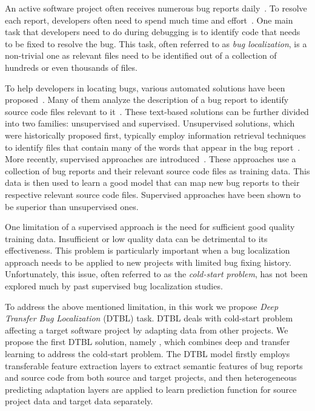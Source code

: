 An active software project often receives numerous bug reports daily~\cite{AnvikHM05}. To resolve each report, developers often need to spend much time and effort~\cite{Tassey02}. One main task that developers need to do during debugging is to identify code that needs to be fixed to resolve the bug. This task, often referred to as {\em bug localization}, is a non-trivial one as relevant files need to be identified out of a collection of hundreds or even thousands of files.

To help developers in locating bugs, various automated solutions have been proposed~\cite{JonesH05,lukins2008source,rao2011retrieval,SahaLKP14,huo2016learning}. Many of them analyze the description of a bug report to identify source code files relevant to it~\cite{lukins2008source,rao2011retrieval,SahaLKP14,huo2016learning}. These text-based solutions can be further divided into two families: unsupervised and supervised. Unsupervised solutions, which were historically proposed first, typically employ information retrieval techniques to identify files that contain many of the words that appear in the bug report~\cite{lukins2008source,rao2011retrieval,SahaLKP14}. More recently, supervised approaches are introduced~\cite{huo2016learning}. These approaches use a collection of bug reports and their relevant source code files as training data. This data is then used to learn a good model that can map new bug reports to their respective relevant source code files. Supervised approaches have been shown to be superior than unsupervised ones.

One limitation of a supervised approach is the need for sufficient good quality training data. Insufficient or low quality data can be detrimental to its effectiveness. This problem is particularly important when a bug localization approach needs to be applied to new projects with limited bug fixing history. Unfortunately, this issue, often referred to as the {\em cold-start problem}, has not been explored much by past supervised bug localization studies.

To address the above mentioned limitation, in this work we propose {\em Deep Transfer Bug Localization} (DTBL) task. DTBL deals with cold-start problem affecting a target software project by adapting data from other projects. We propose the first DTBL solution, namely \TRANPCNN, which combines deep and transfer learning to address the cold-start problem.  The DTBL model firstly employs transferable feature extraction layers to extract semantic features of bug reports and source code from both source and target projects, and then heterogeneous predicting adaptation layers are applied to learn prediction function for source project data and target data separately.  

